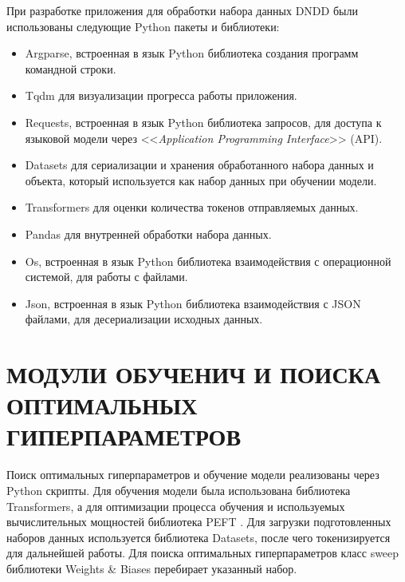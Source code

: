 При разработке приложения для обработки набора данных DNDD были использованы следующие Python пакеты и библиотеки:
\begin{itemize}
    \item Argparse, встроенная в язык Python библиотека создания программ командной строки.
    \item Tqdm \cite{tqdm-docs} для визуализации прогресса работы приложения.
    \item Requests, встроенная в язык Python библиотека запросов, для доступа к языковой модели через <<\textit{Application Programming Interface}>> (API).
    \item Datasets \cite{hf-datasets-docs} для сериализации и хранения обработанного набора данных и объекта, который используется как набор данных при обучении модели.
    \item Transformers \cite{transformers-docs} для оценки количества токенов отправляемых данных.
    \item Pandas \cite{pandas-docs} для внутренней обработки набора данных.
    \item Os, встроенная в язык Python библиотека взаимодействия с операционной системой, для работы с файлами.
    \item Json, встроенная в язык Python библиотека взаимодействия с JSON файлами, для десериализации исходных данных.
\end{itemize}

\section{МОДУЛИ ОБУЧЕНИЧ И ПОИСКА ОПТИМАЛЬНЫХ ГИПЕРПАРАМЕТРОВ}
Поиск оптимальных гиперпараметров и обучение модели реализованы через Python скрипты. Для обучения модели была использована библиотека Transformers, а для оптимизации процесса обучения и используемых вычислительных мощностей библиотека PEFT \cite{peft-docs}. Для загрузки подготовленных наборов данных используется библиотека Datasets, после чего токенизируется для дальнейшей работы. Для поиска оптимальных гиперпараметров класс sweep библиотеки Weights \& Biases \cite{wandb-docs} перебирает указанный набор.